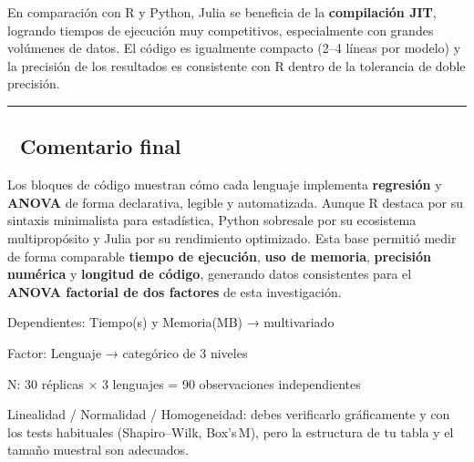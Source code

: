 \documentclass[
  letterpaper,
  DIV=11,
  numbers=noendperiod]{scrartcl}
\begin{document}
En comparación con R y Python, Julia se beneficia de la
\textbf{compilación JIT}, logrando tiempos de ejecución muy
competitivos, especialmente con grandes volúmenes de datos. El código es
igualmente compacto (2--4 líneas por modelo) y la precisión de los
resultados es consistente con R dentro de la tolerancia de doble
precisión.

\begin{center}\rule{0.5\linewidth}{0.5pt}\end{center}

\subsection{\texorpdfstring{📌 \textbf{Comentario
final}}{📌 Comentario final}}\label{comentario-final}

Los bloques de código muestran cómo cada lenguaje implementa
\textbf{regresión} y \textbf{ANOVA} de forma declarativa, legible y
automatizada. Aunque R destaca por su sintaxis minimalista para
estadística, Python sobresale por su ecosistema multipropósito y Julia
por su rendimiento optimizado. Esta base permitió medir de forma
comparable \textbf{tiempo de ejecución}, \textbf{uso de memoria},
\textbf{precisión numérica} y \textbf{longitud de código}, generando
datos consistentes para el \textbf{ANOVA factorial de dos factores} de
esta investigación.

Dependientes: Tiempo(s) y Memoria(MB) → multivariado

Factor: Lenguaje → categórico de 3 niveles

N: 30 réplicas × 3 lenguajes = 90 observaciones independientes

Linealidad / Normalidad / Homogeneidad: debes verificarlo gráficamente y
con los tests habituales (Shapiro--Wilk, Box's\,M), pero la estructura
de tu tabla y el tamaño muestral son adecuados.
\end{document}
